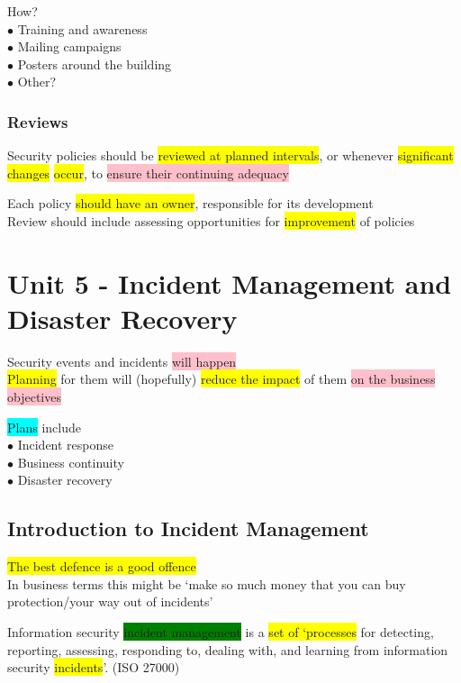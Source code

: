 \documentclass[tikz,border=10pt]{project_plan}
\newcommand{\bulletPoint}{\hspace{-3.1pt}$\bullet$ \hspace{5pt}}
\begin{document}
How?\\
\bulletPoint Training and awareness\\
\bulletPoint Mailing campaigns\\
\bulletPoint Posters around the building\\
\bulletPoint Other?

\subsection{Reviews}

Security policies should be \colorbox{yellow}{reviewed at planned intervals}, or whenever \colorbox{yellow}{significant changes} \colorbox{yellow}{occur}, to \colorbox{pink}{ensure their continuing adequacy}

Each policy \colorbox{yellow}{should have an owner}, responsible for its development\\
Review should include assessing opportunities for \colorbox{yellow}{improvement} of policies

\chapter{Unit 5 - Incident Management and Disaster Recovery}

Security events and incidents \colorbox{pink}{will happen}\\
\colorbox{yellow}{Planning} for them will (hopefully) \colorbox{yellow}{reduce the impact} of them \colorbox{pink}{on the business objectives}

\colorbox{cyan}{Plans} include\\
\bulletPoint Incident response\\
\bulletPoint Business continuity\\
\bulletPoint Disaster recovery

\section{Introduction to Incident Management}

\colorbox{yellow}{The best defence is a good offence}\\
In business terms this might be ‘make so much money that you can buy protection/your way out of incidents’

Information security \colorbox{green}{incident management} is a \colorbox{yellow}{set of ‘processes} for detecting,
reporting, assessing, responding to, dealing with, and learning from information security \colorbox{yellow}{incidents}’.
(ISO 27000)
\end{document}
